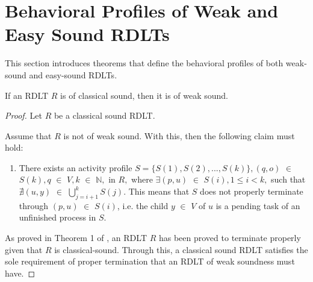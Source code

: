 \section{Behavioral Profiles of Weak and Easy Sound RDLTs}

This section introduces theorems that define the behavioral profiles of both weak-sound and easy-sound RDLTs.

\begin{thm} 
    \label{CtWRDLT}
    If an RDLT $ R $ is of classical sound, then it is of weak sound.
\end{thm}

\begin{proof}
    Let $ R $ be a classical sound RDLT.

    Assume that $ R $ is not of weak sound. With this, then the following claim must hold:

    \begin{enumerate}
        \item There exists an activity profile $ S = \{S(1), S(2), ..., S(k)\}, (q,o) $ $ \in $ $ S(k), q $ $ \in $ $ V, k $ $ \in $ $ \mathbb{N}, $ in $ R, $ where $ \exists (p, u) $ $ \in $ $ S(i), 1 \leq i < k, $ such that $ \nexists(u,y) $ $ \in $ $ \bigcup_{j=i+1}^{k} S(j) $. This means that $ S $ does not properly terminate through $ (p,u) $ $ \in $ $ S(i) $, i.e. the child $ y $ $ \in $ $ V $ of $ u $ is a pending task of an unfinished process in $ S $.
    \end{enumerate}


    As proved in Theorem 1 of \cite{MalinaoPJS2023}, an RDLT $ R $ has been proved to terminate properly given that $ R $ is classical-sound. Through this, a classical sound RDLT satisfies the sole requirement of proper termination that an RDLT of weak soundness must have.
\end{proof}
